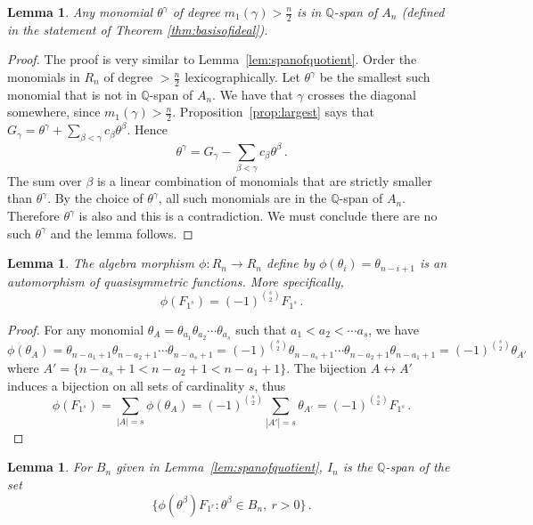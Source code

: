 \documentclass[11pt]{amsart}
\newtheorem{lemma}[theorem]{Lemma}
\theoremstyle{definition}
\numberwithin{equation}{section}
\begin{document}
\begin{lemma}\label{lem:degree}
Any monomial $\theta^\gamma$ of degree $m_1(\gamma)>\frac{n}{2}$ is in  $\mathbb Q$-span of
$A_n$ (defined in the statement of Theorem \ref{thm:basisofideal}).
\end{lemma}

\begin{proof} The proof is very similar  to Lemma~\ref{lem:spanofquotient}.
Order the monomials in $R_n$ of degree $>\frac{n}{2}$ lexicographically.
Let  $\theta^\gamma$ be the smallest such monomial that is not in $\mathbb Q$-span of $A_n$.
We have  that $\gamma$ crosses the  diagonal somewhere, since $m_1(\gamma)>\frac{n}{2}$.
Proposition~\ref{prop:largest} says that
$G_\gamma = \theta^\gamma + \sum_{\beta<\gamma}  c_\beta \theta^\beta$. Hence
$$ \theta^\gamma = G_\gamma  - \sum_{\beta<\gamma} c_\beta \theta^\beta\,.$$
The sum over $\beta$ is a linear combination of monomials that are
strictly smaller than $\theta^\gamma$. By the choice of $\theta^\gamma$,
all such monomials are in the $\mathbb Q$-span of $A_n$. 
Therefore $\theta^\gamma$ is also and this is a contradiction.
We must conclude there are no such $\theta^\gamma$ and the lemma follows.
\end{proof}


\begin{lemma}\label{lem:automorphism}
The algebra morphism $\phi\colon R_n\to R_n$ define by $\phi(\theta_i)=\theta_{n-i+1}$
is an automorphism of quasisymmetric functions. More specifically,
\begin{equation}\label{eq:autoquasi}
\phi(F_{1^s})=(-1)^{s \choose 2} F_{1^s}\,.
\end{equation}
\end{lemma}

\begin{proof} 
For any monomial $\theta_A = \theta_{a_1}\theta_{a_2}\cdots \theta_{a_s}$ such that $a_1<a_2<\cdots a_s$, we have
$$\phi(\theta_A) =  \theta_{n-a_1+1}\theta_{n-a_2+1}\cdots \theta_{n-a_s+1}
= (-1)^{s \choose 2}  \theta_{n-a_s+1}\cdots\theta_{n-a_{2}+1} \theta_{n-a_1+1}
= (-1)^{s \choose 2} \theta_{A'}$$
where $A'=\big\{ n-a_s+1< n-a_{2}+1<n-a_1+1\big\}$.
The bijection $A\leftrightarrow A'$ induces a bijection on all sets of cardinality $s$, thus
$$\phi(F_{1^s})= \sum_{|A|=s} \phi(\theta_A) =  (-1)^{s \choose 2} \sum_{|A'|=s} \theta_{A'}=(-1)^{s \choose 2} F_{1^s}\,.$$
\vskip-18pt \end{proof}

\begin{lemma}\label{lem:idealpres}
For $B_n$ given in Lemma~\ref{lem:spanofquotient}, $I_n$ is the ${\mathbb Q}$-span of the set
\begin{equation}\label{eq:autoquasi}
\big\{ \phi(\theta^\beta) F_{1^r} : \theta^\beta \in B_n,\ r>0\big\}\,.
\end{equation}
\end{lemma}
\end{document}
